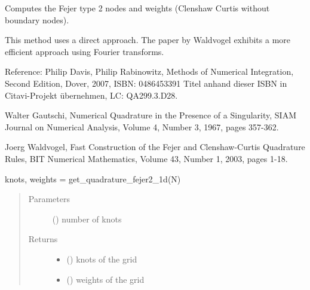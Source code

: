 \documentclass[letterpaper,10pt,english,openany,oneside]{sphinxmanual}
\begin{document}
\begin{fulllineitems}
\label{\detokenize{pygpc:pygpc.grid.get_quadrature_fejer2_1d}}
Computes the Fejer type 2 nodes and weights (Clenshaw Curtis without boundary nodes).

This method uses a direct approach. The paper by Waldvogel
exhibits a more efficient approach using Fourier transforms.

Reference:
Philip Davis, Philip Rabinowitz,
Methods of Numerical Integration,
Second Edition,
Dover, 2007,
ISBN: 0486453391 Titel anhand dieser ISBN in Citavi-Projekt übernehmen,
LC: QA299.3.D28.

Walter Gautschi,
Numerical Quadrature in the Presence of a Singularity,
SIAM Journal on Numerical Analysis,
Volume 4, Number 3, 1967, pages 357-362.

Joerg Waldvogel,
Fast Construction of the Fejer and Clenshaw-Curtis Quadrature Rules,
BIT Numerical Mathematics,
Volume 43, Number 1, 2003, pages 1-18.

knots, weights = get\_quadrature\_fejer2\_1d(N)
\begin{quote}\begin{description}
\item[{Parameters}] \leavevmode
{} () \textendash{} number of knots

\item[{Returns}] \leavevmode
\begin{itemize}
\item {} 
 () \textendash{} knots of the grid

\item {} 
 () \textendash{} weights of the grid

\end{itemize}


\end{description}\end{quote}

\end{fulllineitems}

\end{document}
